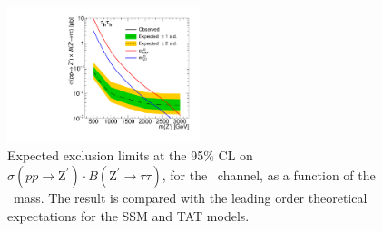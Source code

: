  \begin{figure}[ht]
  \begin{center}
  \captionsetup[subfloat]{farskip=0pt,captionskip=0.0cm,labelformat=empty}
  \includegraphics[clip,width=0.5\textwidth]{figuras/Conclusions/tt_Limits.pdf}
  \end{center}
  \caption{Expected exclusion limits at the 95$\%$ CL on $\sigma (pp \rightarrow \textrm{Z}^{\prime}) \cdot B(\textrm{Z}^{\prime} \rightarrow \tau\tau)$,
  for the \tauh\tauh~channel, as a function of the \Zprime~mass. The result is compared 
  with the leading order theoretical expectations for the SSM and TAT models.}
 \label{fig:ExclusionLimitstauh}
 \end{figure}

